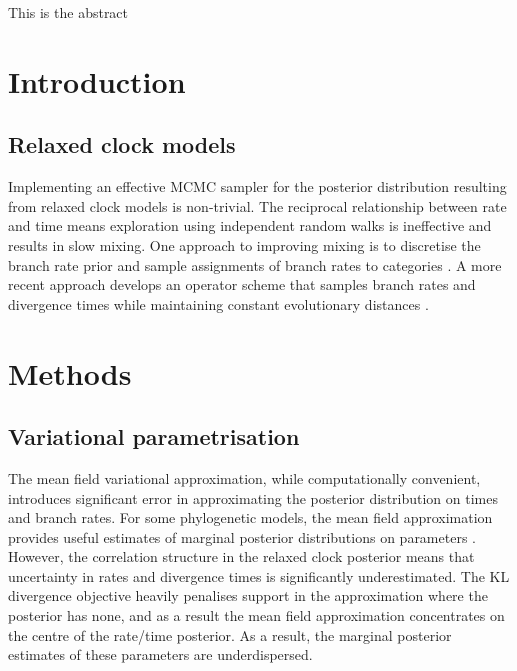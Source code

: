 
\usepackage{booktabs}

This is the abstract

\section*{Introduction}

\subsection*{Relaxed clock models}

Implementing an effective MCMC sampler for the posterior distribution resulting from relaxed clock models is non-trivial. The reciprocal relationship between rate and time means exploration using independent random walks is ineffective and results in slow mixing. One approach to improving mixing is to discretise the branch rate prior and sample assignments of branch rates to categories \cite{drummond2006relaxed}. A more recent approach develops an operator scheme that samples branch rates and divergence times while maintaining constant evolutionary distances \cite{zhang2020improving}.

\section*{Methods}
\subsection*{Variational parametrisation}

The mean field variational approximation, while computationally convenient, introduces significant error in approximating the posterior distribution on times and branch rates. For some phylogenetic models, the mean field approximation provides useful estimates of marginal posterior distributions on parameters \cite{fourment2019evaluating}. However, the correlation structure in the relaxed clock posterior means that uncertainty in rates and divergence times is significantly underestimated. The KL divergence objective heavily penalises support in the approximation where the posterior has none, and as a result the mean field approximation concentrates on the centre of the rate/time posterior. As a result, the marginal posterior estimates of these parameters are underdispersed.


